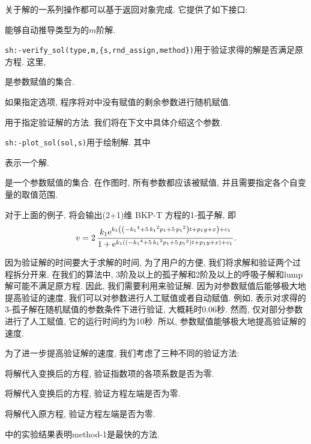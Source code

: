 关于解的一系列操作都可以基于返回对象完成.  它提供了如下接口: 
\begin{compactitem}[\textbullet]
\item {}能够自动推导类型为的$m$阶解. 
\item \verb|sh:-verify_sol(type,m,{s,rnd_assign,method})|用于验证求得的解是否满足原方程. 这里,
\begin{compactitem}[- ]
\item {}是参数赋值的集合.
\item 如果指定选项, 程序将对中没有赋值的剩余参数进行随机赋值.
\item {}用于指定验证解的方法. 我们将在下文中具体介绍这个参数. 
\end{compactitem}
\item \verb|sh:-plot_sol(sol,s)|用于绘制解. 其中
\begin{compactitem}[- ]
\item {} 表示一个解. 
\item {} 是一个参数赋值的集合. 在作图时, 所有参数都应该被赋值, 并且需要指定各个自变量的取值范围.
\end{compactitem}
\end{compactitem}

对于上面的例子, 将会输出(2+1)维 BKP-T 方程的1-孤子解, 即 
\begin{equation}
v=2\,{\frac {k_{{1}}{{\rm e}^{k_{{1}} \left(  \left( -{k_{{1}}}^{4}+5\,{
k_{{1}}}^{2}p_{{1}}+5\,{p_{{1}}}^{2} \right) t+p_{{1}}y+x \right)+c_1 }}}{
1+{{\rm e}^{k_{{1}} \left(  \left( -{k_{{1}}}^{4}+5\,{k_{{1}}}^{2}p_{{
1}}+5\,{p_{{1}}}^{2} \right) t+p_{{1}}y+x \right)+c_1 }}}}.
\end{equation}

因为验证解的时间要大于求解的时间, 为了用户的方便, 我们将求解和验证两个过程拆分开来. 在我们的算法中, 3阶及以上的孤子解和2阶及以上的呼吸子解和lump解可能不满足原方程. 因此, 我们需要利用来验证解. 因为对参数赋值后能够极大地提高验证的速度, 我们可以对参数进行人工赋值或者自动赋值. 例如,  表示对求得的3-孤子解在随机赋值的参数条件下进行验证, 大概耗时0.06秒. 然而, 仅对部分参数进行了人工赋值, 它的运行时间约为10秒. 所以, 参数赋值能够极大地提高验证解的速度. 

为了进一步提高验证解的速度, 我们考虑了三种不同的验证方法: 
\begin{compactenum}[method-1:]
\item 将解代入变换后的方程, 验证指数项的各项系数是否为零.
\item 将解代入变换后的方程, 验证方程左端是否为零.
\item 将解代入原方程, 验证方程左端是否为零.
\end{compactenum}
中的实验结果表明method-1是最快的方法. 

